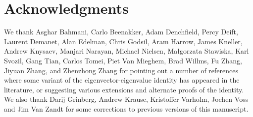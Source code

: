 \documentclass{amsart}
\begin{document}
\section{Acknowledgments}\label{ack}

We thank Asghar Bahmani, Carlo Beenakker, Adam Denchfield, Percy Deift, Laurent Demanet, Alan Edelman, Chris Godsil, Aram Harrow, James Kneller, Andrew Knysaev, Manjari Narayan, Michael Nielsen, Ma{\l}gorzata Stawiska, Karl Svozil, Gang Tian, Carlos Tomei, Piet Van Mieghem, Brad Willms, Fu Zhang, Jiyuan Zhang, and Zhenzhong Zhang for pointing out a number of references where some variant of the eigenvector-eigenvalue identity has appeared in the literature, or suggesting various extensions and alternate proofs of the identity.  We also thank Darij Grinberg, Andrew Krause, Kristoffer Varholm, Jochen Voss and Jim Van Zandt for some corrections to previous versions of this manuscript.



\end{document}

